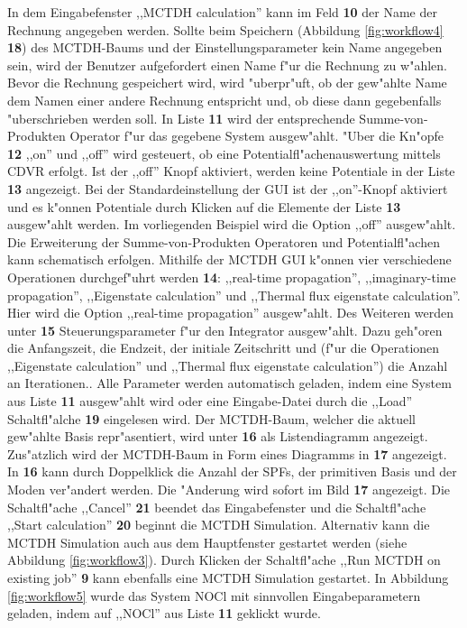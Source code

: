 In dem Eingabefenster ,,MCTDH calculation'' kann im Feld \textbf{10} der Name der Rechnung angegeben werden. 
Sollte beim Speichern (Abbildung \ref{fig:workflow4} \textbf{18}) des MCTDH-Baums und der Einstellungsparameter 
kein Name angegeben sein, wird der Benutzer 
aufgefordert einen Name f"ur die Rechnung zu w"ahlen. Bevor die Rechnung gespeichert wird, 
wird "uberpr"uft, ob der gew"ahlte Name dem Namen einer andere Rechnung entspricht und, ob diese 
dann gegebenfalls "uberschrieben werden soll.
In Liste \textbf{11} wird der entsprechende Summe-von-Produkten Operator f"ur das gegebene System ausgew"ahlt.
"Uber die Kn"opfe \textbf{12} ,,on'' und ,,off'' wird gesteuert, ob eine Potentialfl"achenauswertung mittels 
CDVR erfolgt.
Ist der ,,off'' Knopf aktiviert, werden keine Potentiale in der Liste \textbf{13} angezeigt.
Bei der Standardeinstellung der GUI ist der ,,on''-Knopf aktiviert und es k"onnen Potentiale durch Klicken
auf die Elemente der Liste \textbf{13} ausgew"ahlt werden. Im vorliegenden Beispiel wird die Option ,,off''
ausgew"ahlt.
Die Erweiterung der Summe-von-Produkten Operatoren und Potentialfl"achen kann schematisch erfolgen.
Mithilfe der MCTDH GUI k"onnen vier verschiedene Operationen durchgef"uhrt werden \textbf{14}:
,,real-time propagation'', ,,imaginary-time propagation'', ,,Eigenstate calculation'' und ,,Thermal flux eigenstate calculation''.
Hier wird die Option ,,real-time propagation'' ausgew"ahlt.
Des Weiteren werden unter \textbf{15} Steuerungsparameter f"ur den Integrator ausgew"ahlt. Dazu geh"oren die Anfangszeit, die Endzeit,
der initiale Zeitschritt und (f"ur die Operationen ,,Eigenstate calculation'' und ,,Thermal flux eigenstate calculation'')
die Anzahl an Iterationen.. Alle Parameter werden automatisch geladen, indem eine System aus
Liste \textbf{11} ausgew"ahlt wird oder eine Eingabe-Datei durch 
die ,,Load'' Schaltfl"alche \textbf{19} eingelesen wird. 
Der MCTDH-Baum, welcher die aktuell gew"ahlte Basis repr"asentiert, wird unter \textbf{16} als Listendiagramm angezeigt. 
Zus"atzlich wird der MCTDH-Baum in Form eines Diagramms in \textbf{17} angezeigt. In \textbf{16}
kann durch Doppelklick die Anzahl der SPFs, der primitiven Basis und der Moden ver"andert werden.
Die "Anderung wird sofort im Bild \textbf{17} angezeigt.
Die Schaltfl"ache ,,Cancel'' \textbf{21} beendet das Eingabefenster
und die Schaltfl"ache ,,Start calculation'' \textbf{20} beginnt die MCTDH Simulation.
Alternativ kann die MCTDH Simulation auch aus dem Hauptfenster gestartet werden (siehe Abbildung \ref{fig:workflow3}).
Durch Klicken der Schaltfl"ache ,,Run MCTDH on existing job'' \textbf{9} kann ebenfalls
eine MCTDH Simulation gestartet.
In Abbildung \ref{fig:workflow5} wurde das System NOCl mit sinnvollen Eingabeparametern geladen,
indem auf ,,NOCl'' aus Liste \textbf{11} geklickt wurde.

